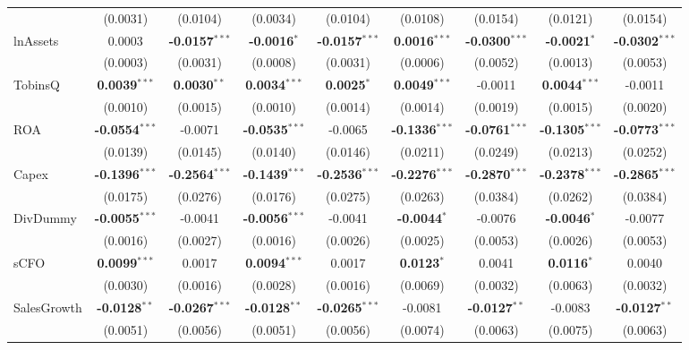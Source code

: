 \documentclass[11pt,a4paper]{article}
\begin{document}
\begin{table}[htbp]
\begin{tabular}{lcccccccc}
 & (0.0031) & (0.0104) & (0.0034) & (0.0104) & (0.0108) & (0.0154) & (0.0121) & (0.0154) \\
lnAssets & 0.0003 & \textbf{-0.0157}$^{***}$ & \textbf{-0.0016}$^{*}$ & \textbf{-0.0157}$^{***}$ & \textbf{0.0016}$^{***}$ & \textbf{-0.0300}$^{***}$ & \textbf{-0.0021}$^{*}$ & \textbf{-0.0302}$^{***}$ \\
 & (0.0003) & (0.0031) & (0.0008) & (0.0031) & (0.0006) & (0.0052) & (0.0013) & (0.0053) \\
TobinsQ & \textbf{0.0039}$^{***}$ & \textbf{0.0030}$^{**}$ & \textbf{0.0034}$^{***}$ & \textbf{0.0025}$^{*}$ & \textbf{0.0049}$^{***}$ & -0.0011 & \textbf{0.0044}$^{***}$ & -0.0011 \\
 & (0.0010) & (0.0015) & (0.0010) & (0.0014) & (0.0014) & (0.0019) & (0.0015) & (0.0020) \\
ROA & \textbf{-0.0554}$^{***}$ & -0.0071 & \textbf{-0.0535}$^{***}$ & -0.0065 & \textbf{-0.1336}$^{***}$ & \textbf{-0.0761}$^{***}$ & \textbf{-0.1305}$^{***}$ & \textbf{-0.0773}$^{***}$ \\
 & (0.0139) & (0.0145) & (0.0140) & (0.0146) & (0.0211) & (0.0249) & (0.0213) & (0.0252) \\
Capex & \textbf{-0.1396}$^{***}$ & \textbf{-0.2564}$^{***}$ & \textbf{-0.1439}$^{***}$ & \textbf{-0.2536}$^{***}$ & \textbf{-0.2276}$^{***}$ & \textbf{-0.2870}$^{***}$ & \textbf{-0.2378}$^{***}$ & \textbf{-0.2865}$^{***}$ \\
 & (0.0175) & (0.0276) & (0.0176) & (0.0275) & (0.0263) & (0.0384) & (0.0262) & (0.0384) \\
DivDummy & \textbf{-0.0055}$^{***}$ & -0.0041 & \textbf{-0.0056}$^{***}$ & -0.0041 & \textbf{-0.0044}$^{*}$ & -0.0076 & \textbf{-0.0046}$^{*}$ & -0.0077 \\
 & (0.0016) & (0.0027) & (0.0016) & (0.0026) & (0.0025) & (0.0053) & (0.0026) & (0.0053) \\
sCFO & \textbf{0.0099}$^{***}$ & 0.0017 & \textbf{0.0094}$^{***}$ & 0.0017 & \textbf{0.0123}$^{*}$ & 0.0041 & \textbf{0.0116}$^{*}$ & 0.0040 \\
 & (0.0030) & (0.0016) & (0.0028) & (0.0016) & (0.0069) & (0.0032) & (0.0063) & (0.0032) \\
SalesGrowth & \textbf{-0.0128}$^{**}$ & \textbf{-0.0267}$^{***}$ & \textbf{-0.0128}$^{**}$ & \textbf{-0.0265}$^{***}$ & -0.0081 & \textbf{-0.0127}$^{**}$ & -0.0083 & \textbf{-0.0127}$^{**}$ \\
 & (0.0051) & (0.0056) & (0.0051) & (0.0056) & (0.0074) & (0.0063) & (0.0075) & (0.0063) \\

\end{tabular}
\end{table}
\end{document}
